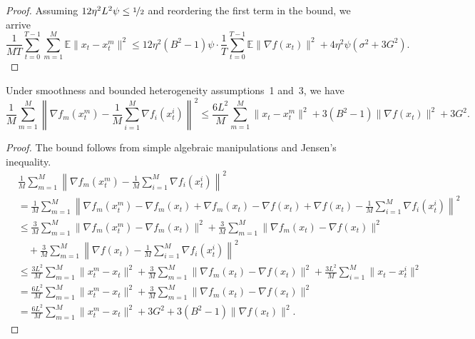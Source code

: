 \begin{proof}
Assuming $12\eta^2 L^2 \psi \leq \nicefrac{1}{2}$ and reordering the first term in the bound, we arrive
\[
\frac{1}{MT}\sum_{t=0}^{T-1}\sum_{m=1}^{M}\mathbb{E}\|x_t - x_t^m\|^2
\leq 12\eta^2(B^2-1)\psi\cdot\frac{1}{T}\sum_{t=0}^{T-1}\mathbb{E}\|\nabla f(x_t)\|^2 + 4\eta^2\psi(\sigma^2 + 3G^2).
\]
\end{proof}

\begin{lemma}
\label{lem:het}
Under smoothness and bounded heterogeneity assumptions~1 and~3, we have
\[
\frac{1}{M}\sum_{m=1}^{M}\left\|\nabla f_m(x_t^m) - \frac{1}{M}\sum_{i=1}^{M}\nabla f_i(x_t^i)\right\|^2
\leq \frac{6L^2}{M}\sum_{m=1}^{M}\|x_t - x_t^m\|^2 + 3(B^2-1)\|\nabla f(x_t)\|^2 + 3G^2.
\]
\end{lemma}

\begin{proof}
The bound follows from simple algebraic manipulations and Jensen's inequality.
\begin{align*}
&\frac{1}{M}\sum_{m=1}^{M}\left\|\nabla f_m(x_t^m) - \frac{1}{M}\sum_{i=1}^{M}\nabla f_i(x_t^i)\right\|^2 \\
&= \frac{1}{M}\sum_{m=1}^{M}\left\|\nabla f_m(x_t^m) - \nabla f_m(x_t) + \nabla f_m(x_t) - \nabla f(x_t) + \nabla f(x_t) - \frac{1}{M}\sum_{i=1}^{M}\nabla f_i(x_t^i)\right\|^2 \\
&\leq \frac{3}{M}\sum_{m=1}^{M}\|\nabla f_m(x_t^m) - \nabla f_m(x_t)\|^2
   + \frac{3}{M}\sum_{m=1}^{M}\|\nabla f_m(x_t) - \nabla f(x_t)\|^2 \\
&\quad + \frac{3}{M}\sum_{m=1}^{M}\left\|\nabla f(x_t) - \frac{1}{M}\sum_{i=1}^{M}\nabla f_i(x_t^i)\right\|^2 \\
&\leq \frac{3L^2}{M}\sum_{m=1}^{M}\|x_t^m - x_t\|^2
   + \frac{3}{M}\sum_{m=1}^{M}\|\nabla f_m(x_t) - \nabla f(x_t)\|^2
   + \frac{3L^2}{M}\sum_{i=1}^{M}\|x_t - x_t^i\|^2 \\
&= \frac{6L^2}{M}\sum_{m=1}^{M}\|x_t^m - x_t\|^2
   + \frac{3}{M}\sum_{m=1}^{M}\|\nabla f_m(x_t) - \nabla f(x_t)\|^2 \\
&= \frac{6L^2}{M}\sum_{m=1}^{M}\|x_t^m - x_t\|^2 + 3G^2 + 3(B^2-1)\|\nabla f(x_t)\|^2.
\end{align*}
\end{proof}

